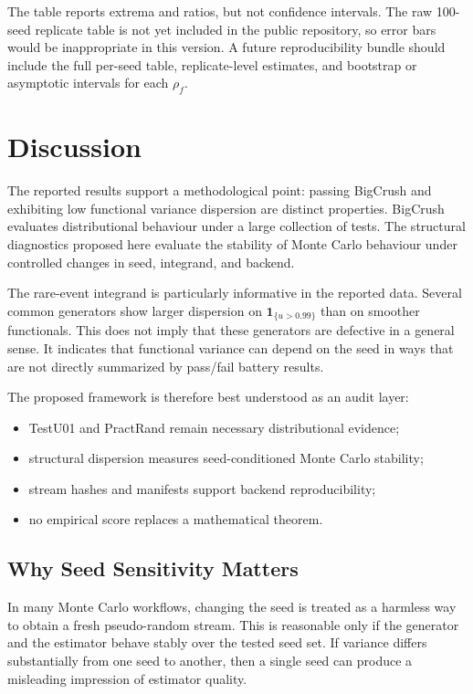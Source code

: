 \documentclass[11pt,a4paper]{article}
\begin{document}
The table reports extrema and ratios, but not confidence intervals. The raw 100-seed replicate table is not yet included in the public repository, so error bars would be inappropriate in this version. A future reproducibility bundle should include the full per-seed table, replicate-level estimates, and bootstrap or asymptotic intervals for each $\rho_f$.

\section{Discussion}

The reported results support a methodological point: passing BigCrush and exhibiting low functional variance dispersion are distinct properties. BigCrush evaluates distributional behaviour under a large collection of tests. The structural diagnostics proposed here evaluate the stability of Monte Carlo behaviour under controlled changes in seed, integrand, and backend.

The rare-event integrand is particularly informative in the reported data. Several common generators show larger dispersion on $\mathbf{1}_{\{u>0.99\}}$ than on smoother functionals. This does not imply that these generators are defective in a general sense. It indicates that functional variance can depend on the seed in ways that are not directly summarized by pass/fail battery results.

The proposed framework is therefore best understood as an audit layer:

\begin{itemize}[nosep]
  \item TestU01 and PractRand remain necessary distributional evidence;
  \item structural dispersion measures seed-conditioned Monte Carlo stability;
  \item stream hashes and manifests support backend reproducibility;
  \item no empirical score replaces a mathematical theorem.
\end{itemize}

\subsection{Why Seed Sensitivity Matters}

In many Monte Carlo workflows, changing the seed is treated as a harmless way to obtain a fresh pseudo-random stream. This is reasonable only if the generator and the estimator behave stably over the tested seed set. If variance differs substantially from one seed to another, then a single seed can produce a misleading impression of estimator quality.
\end{document}
